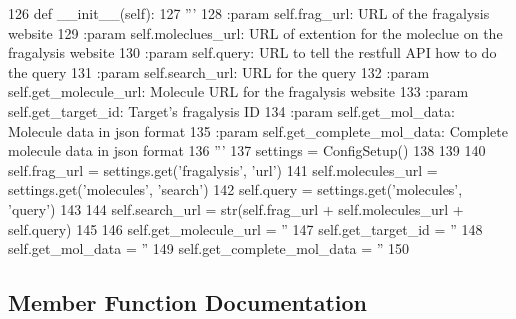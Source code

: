 \begin{DoxyCode}
126     \textcolor{keyword}{def }\_\_init\_\_(self):
127         \textcolor{stringliteral}{'''}
128 \textcolor{stringliteral}{        :param self.frag\_url: URL of the fragalysis website}
129 \textcolor{stringliteral}{        :param self.moleclues\_url: URL of extention for the moleclue on the fragalysis website}
130 \textcolor{stringliteral}{        :param self.query: URL to tell the restfull API how to do the query}
131 \textcolor{stringliteral}{        :param self.search\_url: URL for the query }
132 \textcolor{stringliteral}{        :param self.get\_molecule\_url: Molecule URL for the fragalysis website}
133 \textcolor{stringliteral}{        :param self.get\_target\_id: Target's fragalysis ID }
134 \textcolor{stringliteral}{        :param self.get\_mol\_data: Molecule data in json format}
135 \textcolor{stringliteral}{        :param self.get\_complete\_mol\_data: Complete molecule data in json format}
136 \textcolor{stringliteral}{        '''}
137         settings = ConfigSetup()
138 
139 
140         self.frag\_url = settings.get(\textcolor{stringliteral}{'fragalysis'}, \textcolor{stringliteral}{'url'})
141         self.molecules\_url = settings.get(\textcolor{stringliteral}{'molecules'}, \textcolor{stringliteral}{'search'})
142         self.query = settings.get(\textcolor{stringliteral}{'molecules'}, \textcolor{stringliteral}{'query'})
143 
144         self.search\_url = str(self.frag\_url + self.molecules\_url + self.query)
145 
146         self.get\_molecule\_url = \textcolor{stringliteral}{''}
147         self.get\_target\_id = \textcolor{stringliteral}{''}
148         self.get\_mol\_data = \textcolor{stringliteral}{''}
149         self.get\_complete\_mol\_data = \textcolor{stringliteral}{''}
150 
\end{DoxyCode}


\subsection{Member Function Documentation}
\mbox{\label{classfragalysis__api_1_1xcextracter_1_1getdata_1_1_get_molecules_data_a5bf2f4562196e169f76aa30cdcd9029d}} 
